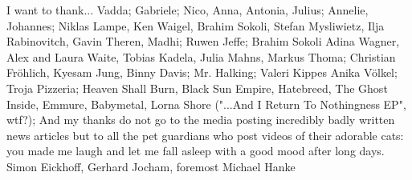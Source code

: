 I want to thank...
Vadda; Gabriele; Nico, Anna, Antonia, Julius; Annelie, Johannes;
%
Niklas Lampe, Ken Waigel, Brahim Sokoli, Stefan Mysliwietz, Ilja Rabinovitch,
Gavin Theren, Madhi; Ruwen Jeffe; Brahim Sokoli
Adina Wagner, Alex and Laura Waite, Tobias Kadela, Julia Mahns, Markus Thoma;
Christian Fröhlich, Kyesam Jung, Binny Davis;
Mr. Halking; Valeri Kippes
Anika Völkel;
Troja Pizzeria;
Heaven Shall Burn, Black Sun Empire, Hatebreed, The Ghost Inside, Emmure,
Babymetal, Lorna Shore ("...And I Return To Nothingness EP", wtf?);
%
And my thanks do not go to the media posting incredibly badly written news articles
but to all the pet guardians who post videos of their adorable cats: you made
me laugh and let me fall asleep with a good mood after long days.
Simon Eickhoff, Gerhard Jocham, foremost Michael Hanke
%


